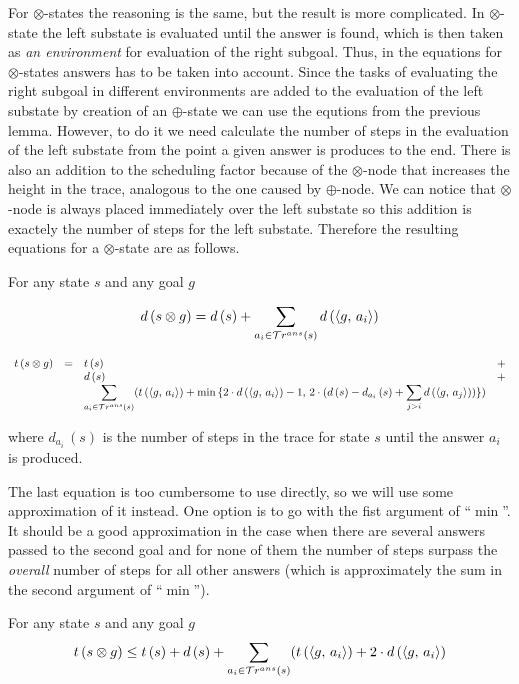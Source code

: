 For $\otimes$-states the reasoning is the same, but the result is more complicated. In $\otimes$-state the left substate is evaluated until the answer is found, which is then taken as \emph{an environment} for evaluation of the right subgoal. Thus, in the equations for $\otimes$-states answers
has to be taken into account. Since the tasks of evaluating the right subgoal in different environments are added to the evaluation of the left substate by creation of an $\oplus$-state we can use the equtions from the previous lemma. However, to do it we need calculate the number of steps in the evaluation of the left substate from the point a given answer is produces to the end. There is also an addition to the scheduling factor because of the $\otimes$-node that increases the height in the trace, analogous to the one caused by $\oplus$-node. We can notice that $\otimes$-node is always placed immediately over the left substate so this addition is exactely the number of steps for the left substate. Therefore the resulting equations for a $\otimes$-state are as follows.

\begin{lemma}
For any state $s$ and any goal $g$

\[
d\,(s \otimes g) = d\,(s) + \displaystyle\sum\limits_{a_i \in \mathcal{T}r^{ans}(s)} d\,(\langle g ,\, a_i \rangle)
\]

\[
\begin{array}{rclc}
  t\,(s \otimes g) &=& t\,(s) & + \\
                   & & d\,(s) & + \\
  & & \displaystyle\sum\limits_{a_i \in \mathcal{T}r^{ans}(s)} (t\,(\langle g ,\, a_i \rangle) + \min\,\{2\cdot d\,(\langle g ,\, a_i \rangle) - 1,\,2\cdot (d\,(s) - d_{a_i}\,(s) + \displaystyle\sum\limits_{j > i} d\,(\langle g ,\, a_j \rangle))\})
\end{array}
\]

where $d_{a_i}\,(s)$ is the number of steps in the trace for state $s$ until the answer $a_i$ is produced.
\end{lemma}

The last equation is too cumbersome to use directly, so we will use some approximation of it instead. One option is to go with the fist argument of ``$\min$''. It should be a good approximation
in the case when there are several answers passed to the second goal and for none of them the number of steps surpass the \emph{overall} number of steps for all other answers (which is approximately the sum in the second argument of ``$\min$'').

\begin{corollary}
\label{lem:prod_estimation_multiple_answers}
For any state $s$ and any goal $g$
\[ t\,(s \otimes g) \le t\,(s) + d\,(s) +  \displaystyle\sum\limits_{a_i \in \mathcal{T}r^{ans}(s)} (t\,(\langle g ,\, a_i \rangle) + 2\cdot d\,(\langle g ,\, a_i \rangle) \]
\end{corollary}

